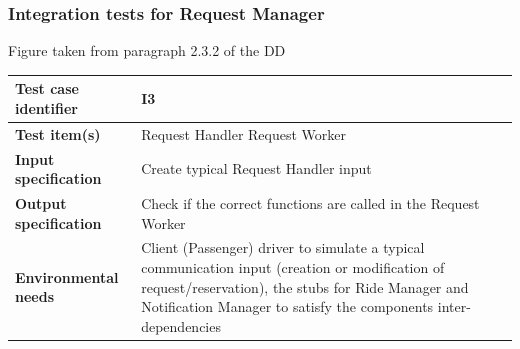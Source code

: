 \documentclass[a4paper,11pt]{report} %
\begin{document}
		\subsubsection{Integration tests for Request Manager} \label{sec:3.1.2}
		\begin{minipage}{\linewidth}
		\end{minipage}
		\begin{center}
			Figure taken from paragraph 2.3.2 of the DD
		\end{center} 
		\begin{center}
				\renewcommand{\arraystretch}{1.2}
				\setlength{\tabcolsep}{24pt}
			\begin{tabular}{ l  p{9cm}}\hline
				\textbf{Test case identifier} & I3\\\hline
				\textbf{Test item(s)} & Request Handler \textrightarrow Request Worker\\\hline
				\textbf{Input specification} & Create typical Request Handler input \\\hline
				\textbf{Output specification} & Check if the correct functions are called in the Request Worker\\\hline
				\textbf{Environmental needs} & Client (Passenger) driver to simulate a typical communication input (creation or modification of request/reservation), the stubs for Ride Manager and Notification Manager to satisfy the components inter-dependencies\\\hline
			\end{tabular}
		\end{center}	
		\bigskip	
\end{document}
